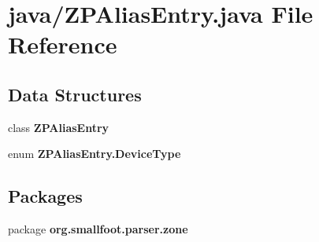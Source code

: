 \section{java/\-Z\-P\-Alias\-Entry.java File Reference}
\label{ZPAliasEntry_8java}
\subsection*{Data Structures}
\begin{DoxyCompactItemize}
\item 
class {\bf Z\-P\-Alias\-Entry}
\item 
enum {\bf Z\-P\-Alias\-Entry.\-Device\-Type}
\end{DoxyCompactItemize}
\subsection*{Packages}
\begin{DoxyCompactItemize}
\item 
package {\bf org.\-smallfoot.\-parser.\-zone}
\end{DoxyCompactItemize}
